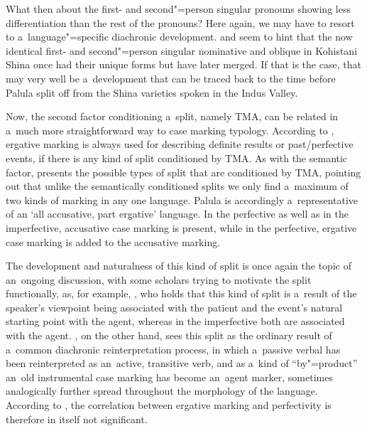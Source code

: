 What then about the first- and second"=person singular pronouns showing less differentiation than the rest of the pronouns? Here again, we may have to resort to a~language"=specific diachronic development. \citet[208]{schmidt2000} and \citet[133]{schmidtkohistani2001} seem to hint that the now identical first- and second"=person singular nominative and oblique in Kohistani Shina once had their unique forms but have later merged. If that is the case, that may very well be a~development that can be traced back to the time before Palula split off from the Shina varieties spoken in the Indus Valley. 



Now, the second factor conditioning a~split, namely TMA, can be related in a~much more straightforward way to case marking typology. According to \citet[99, 101]{dixon1994}, ergative marking is always used for describing definite results or past/perfective events, if there is any kind of split conditioned by TMA. As with the semantic factor, \citet[110]{dixon1994} presents the possible types of split that are conditioned by TMA, pointing out that unlike the semantically conditioned splits we only find a~maximum of two kinds of marking in any one language. Palula is accordingly a~representative of an `all accusative, part ergative' language. In the perfective as well as in the imperfective, accusative case marking is present, while in the perfective, ergative case marking is added to the accusative marking.



The development and naturalness of this kind of split is once again the topic of an~ongoing discussion, with some scholars trying to motivate the split functionally, as, for example, \citet[639--647]{delancey1981}, who holds that this kind of split is a~result of the speaker's viewpoint being associated with the patient and the event's natural starting point with the agent, whereas in the imperfective both are associated with the agent. \citet[262--263]{garrett1990}, on the other hand, sees this split as the ordinary result of a~common diachronic reinterpretation process, in which a~passive verbal has been reinterpreted as an~active, transitive verb, and as a~kind of ``by"=product'' an~old instrumental case marking has become an~agent marker, sometimes analogically further spread throughout the morphology of the language. According to \citet[264]{garrett1990}, the correlation between ergative marking and perfectivity is therefore in itself not significant.



